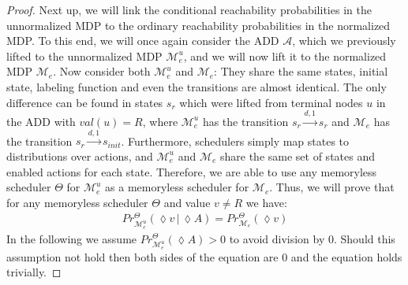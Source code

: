 \begin{proof}
	
	Next up, we will link the conditional reachability probabilities in the unnormalized MDP to the ordinary reachability probabilities in the normalized MDP.
	To this end, we will once again consider the ADD $\mathcal{A}$, which we previously lifted to the unnormalized MDP $\mathcal{M}^u_e$, and we will now lift it to the normalized MDP $\mathcal{M}_e$.
	Now consider both $\mathcal{M}^u_e$ and $\mathcal{M}_e$:
	They share the same states, initial state, labeling function and even the transitions are almost identical.
	The only difference can be found in states $s_r$ which were lifted from terminal nodes $u$ in the ADD with $\mathit{val}(u) = R$, where $\mathcal{M}^u_e$ has the transition $s_r \xrightarrow{d, 1} s_r$ and $\mathcal{M}_e$ has the transition $s_r \xrightarrow{d, 1}s_{init}$.
	Furthermore, schedulers simply map states to distributions over actions, and $\mathcal{M}^u_e$ and $\mathcal{M}_e$ share the same set of states and enabled actions for each state.
	Therefore, we are able to use any memoryless scheduler $\Theta$ for $\mathcal{M}^u_e$ as a memoryless scheduler for $\mathcal{M}_e$.
	Thus, we will prove that for any memoryless scheduler $\Theta$ and value $v \neq R$ we have:
	\begin{align*}
		Pr^{\Theta }_{\mathcal{M}^u_e} (\lozenge v \,|\, \lozenge A) = Pr^{\Theta }_{\mathcal{M}_e} (\lozenge v) \tag{II}\label{Equation2} 
	\end{align*}
	In the following we assume $Pr^{\Theta }_{\mathcal{M}^u_e} (\lozenge A) > 0$ to avoid division by $0$.
	Should this assumption not hold then both sides of the equation are $0$ and the equation holds trivially.
	

\end{proof}
